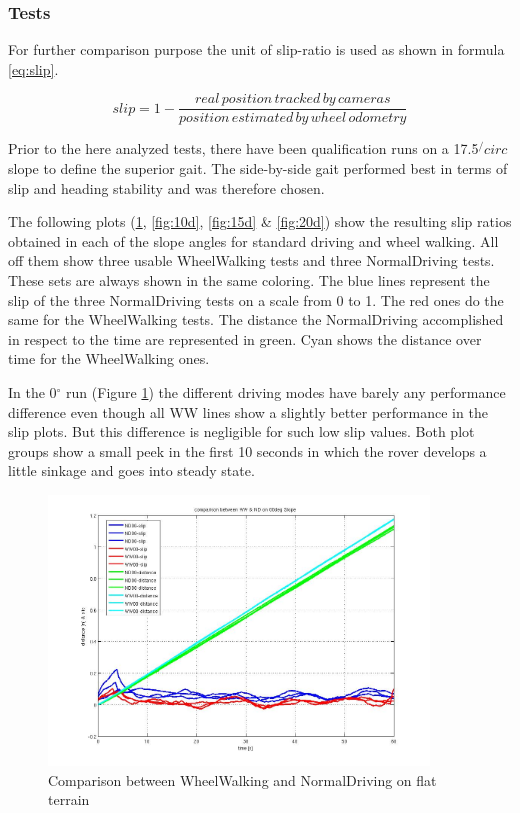 \documentclass[a4paper,twocolumn]{esapub2005} %
\begin{document}
\subsubsection{Tests}
For further comparison purpose the unit of slip-ratio is used as shown in formula \ref{eq:slip}.

\begin{equation}
    slip = 1- \frac{real\, position\, tracked\, by\, cameras}{position\, estimated\, by\, wheel\, odometry}
		\label{eq:slip}
\end{equation}

Prior to the here analyzed tests, there have been qualification runs on a 17.5$^/circ$ slope to define the superior gait.
The side-by-side gait performed best in terms of slip and heading stability and was therefore chosen. 


The following plots (\ref{fig:00d}, \ref{fig:10d}, \ref{fig:15d} \& \ref{fig:20d}) show the resulting slip ratios obtained in each of the slope angles for standard driving and wheel walking. All off them show three usable WheelWalking tests and three NormalDriving tests. These sets are always shown in the same coloring. The blue lines represent the slip of the three NormalDriving tests on a scale from 0 to 1. The red ones do the same for the WheelWalking tests. The distance the NormalDriving accomplished in respect to the time are represented in green. Cyan shows the distance over time for the WheelWalking ones.

In the 0$^\circ$ run (Figure \ref{fig:00d}) the different driving modes have barely any performance difference even though all WW lines show a slightly better performance in the slip plots. But this difference is negligible for such low slip values. Both plot groups show a small peek in the first 10 seconds in which the rover develops a little sinkage and goes into steady state. 


\begin{figure}[h!]
	\centering		\includegraphics[width=0.9\textwidth]{00d.JPG}	
	\caption{Comparison between WheelWalking and NormalDriving on flat terrain}
	\label{fig:00d}
\end{figure}
\end{document}
